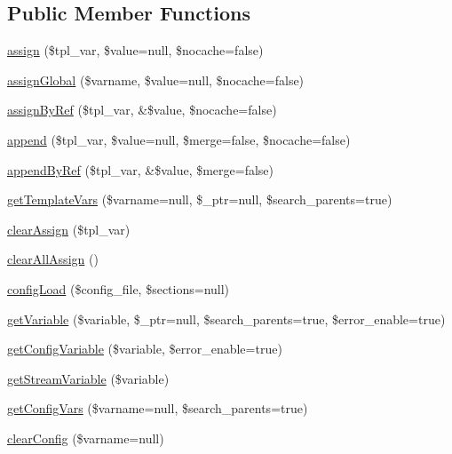 \subsection*{Public Member Functions}
\begin{DoxyCompactItemize}
\item 
\hyperlink{class_smarty___internal___data_a5f97942987c58059c5f0408c950bb0b9}{assign} (\$tpl\+\_\+var, \$value=null, \$nocache=false)
\item 
\hyperlink{class_smarty___internal___data_af7d90ddb08c1eb9121c5f5b61712afe1}{assign\+Global} (\$varname, \$value=null, \$nocache=false)
\item 
\hyperlink{class_smarty___internal___data_a29903ae6eb34b6ea1dbc285f4ea78430}{assign\+By\+Ref} (\$tpl\+\_\+var, \&\$value, \$nocache=false)
\item 
\hyperlink{class_smarty___internal___data_ae440c91b4d3b5c221fe5243fe1e7eee9}{append} (\$tpl\+\_\+var, \$value=null, \$merge=false, \$nocache=false)
\item 
\hyperlink{class_smarty___internal___data_a44182877d96ea6ad3cfadf2455037ff2}{append\+By\+Ref} (\$tpl\+\_\+var, \&\$value, \$merge=false)
\item 
\hyperlink{class_smarty___internal___data_ae048703bf66ff6d2b0e980987c696555}{get\+Template\+Vars} (\$varname=null, \$\+\_\+ptr=null, \$search\+\_\+parents=true)
\item 
\hyperlink{class_smarty___internal___data_ad7d2c8b99bc3afcc2e64853eff1ac47c}{clear\+Assign} (\$tpl\+\_\+var)
\item 
\hyperlink{class_smarty___internal___data_aa6525c430552dc727c5539ff83a8a959}{clear\+All\+Assign} ()
\item 
\hyperlink{class_smarty___internal___data_aed2ef2106d271efe52ec0ae78966ca95}{config\+Load} (\$config\+\_\+file, \$sections=null)
\item 
\hyperlink{class_smarty___internal___data_a6019260fa5ec2ccfbb5c856f99753374}{get\+Variable} (\$variable, \$\+\_\+ptr=null, \$search\+\_\+parents=true, \$error\+\_\+enable=true)
\item 
\hyperlink{class_smarty___internal___data_acf6d5cd027c854ea89d514ce30082397}{get\+Config\+Variable} (\$variable, \$error\+\_\+enable=true)
\item 
\hyperlink{class_smarty___internal___data_af384b9c50fa8c6d6c2a3cb78d1b87674}{get\+Stream\+Variable} (\$variable)
\item 
\hyperlink{class_smarty___internal___data_a11ed94975ddbc02d6290e3862a519e00}{get\+Config\+Vars} (\$varname=null, \$search\+\_\+parents=true)
\item 
\hyperlink{class_smarty___internal___data_a2f79c14de75809c9da291e15cd2c760a}{clear\+Config} (\$varname=null)
\end{DoxyCompactItemize}
